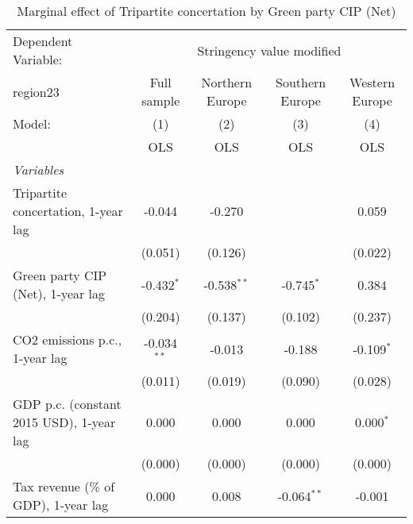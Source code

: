 
\begin{table}[htbp]
   \caption{Marginal effect of Tripartite concertation by Green party CIP (Net)}
   \centering
   \begin{tabular}{lcccc}
      \toprule
      Dependent Variable: & \multicolumn{4}{c}{Stringency value modified}\\
      region23                                                                & Full sample   & Northern Europe & Southern Europe & Western Europe \\   
      Model:                                                                  & (1)           & (2)             & (3)             & (4)\\  
                                                                              &  OLS          & OLS             & OLS             & OLS\\  
      \midrule
      \emph{Variables}\\
      Tripartite concertation, 1-year lag                                     & -0.044        & -0.270          &                 & 0.059\\   
                                                                              & (0.051)       & (0.126)         &                 & (0.022)\\   
      Green party CIP (Net), 1-year lag                                       & -0.432$^{*}$  & -0.538$^{**}$   & -0.745$^{*}$    & 0.384\\   
                                                                              & (0.204)       & (0.137)         & (0.102)         & (0.237)\\   
      CO2 emissions p.c., 1-year lag                                          & -0.034$^{**}$ & -0.013          & -0.188          & -0.109$^{*}$\\   
                                                                              & (0.011)       & (0.019)         & (0.090)         & (0.028)\\   
      GDP p.c. (constant 2015 USD), 1-year lag                                & 0.000         & 0.000           & 0.000           & 0.000$^{*}$\\   
                                                                              & (0.000)       & (0.000)         & (0.000)         & (0.000)\\   
      Tax revenue (\% of GDP), 1-year lag                                     & 0.000         & 0.008           & -0.064$^{**}$   & -0.001\\   

\end{tabular}
\end{table}
